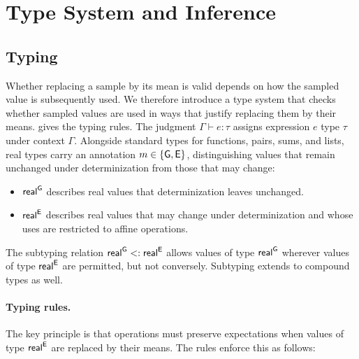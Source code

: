 \section{Type System and Inference}
\label{sec:type-system}

\subsection{Typing}

Whether replacing a sample by its mean is valid depends on how the
sampled value is subsequently used.
We therefore introduce a type system that checks whether sampled values are used in ways that justify replacing them by their means.  gives the typing rules.
The judgment $\Gamma\vdash e:\tau$ assigns expression $e$ type
$\tau$ under context $\Gamma$. Alongside standard types for
functions, pairs, sums, and lists, real types carry an annotation
$m\in\{\mathsf{G},\mathsf{E}\}$, distinguishing values that remain unchanged under
determinization from those that may change:
\begin{itemize}
    \item $\mathsf{real}^{\mathsf{G}}$ describes real values that determinization leaves
    unchanged.
    \item $\mathsf{real}^{\mathsf{E}}$ describes real values that may change under
    determinization and whose uses are restricted to affine operations.
\end{itemize}
The subtyping relation
$\mathsf{real}^{\mathsf{G}}<:\mathsf{real}^{\mathsf{E}}$ allows values of type $\mathsf{real}^{\mathsf{G}}$ wherever values of type $\mathsf{real}^{\mathsf{E}}$ are permitted, but not conversely.
Subtyping extends to compound types as well.



\paragraph{Typing rules.}
The key principle is that operations must preserve expectations when values of type $\mathsf{real}^{\mathsf{E}}$
are replaced by their means. The rules enforce this as follows:


